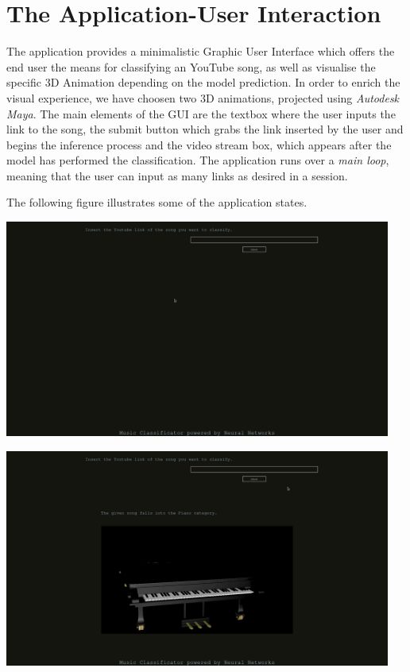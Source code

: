 \section{The Application-User Interaction}
	The application provides a minimalistic Graphic User Interface which offers the end user the means for
	classifying an YouTube song, as well as visualise the specific 3D Animation depending on the model prediction.
	In order to enrich the visual experience, we have choosen two 3D animations, projected using \textit{Autodesk
	Maya}. The main elements of the GUI are the textbox where the user inputs the link to the song, the submit
	button which grabs the link inserted by the user and begins the inference process and the video stream box,
	which appears after the model has performed the classification. The application runs over a \textit{main loop},
	meaning that the user can input as many links as desired in a session.


	The following figure illustrates some of the application states.


			\begin{center}
				\centering
				\includegraphics[width = 5.0in]{images/basic_interface.png}
				\centerline{}
			\label{guis}
			\end{center}

			\begin{center}
				\centering
				\includegraphics[width = 5.0in]{images/piano.png}
			\centerline{}
			\label{guip}
			\end{center}


